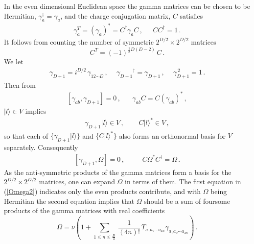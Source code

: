 \documentclass[a4paper,11pt]{article}
\newcommand{\const}{{\nu}}
\def\const{{\nu}}
\begin{document}
In the  even dimensional Euclidean space the gamma matrices can be chosen to be Hermitian, $\gamma_a^{\dagger}=\gamma_a$, and the charge conjugation
matrix, $C$  satisfies
\begin{equation}
\begin{array}{lll}
\gamma_a^{T}=(\gamma_{a})^{\ast}=C^{\dagger}\gamma_{a}C\,,~~~& CC^{\dagger}=1\,. \label{charge}
\end{array}
\end{equation}
It follows from counting the number of symmetric $2^{D/2}\times 2^{D/2}$ matrices\,\cite{Scherkkugotownsend}
\begin{equation}
C^{T}=(-1)^{\frac{1}{8}D(D-2)}\,C\,.
\end{equation}
We let
\begin{equation}
\begin{array}{lll}
\gamma_{D+1}=i^{D/2}\,\gamma_{12\cdots D}\,,~&~\gamma_{D+1}{}^{\dagger}=\gamma_{D+1}\,,~&~\gamma_{D+1}^{\,2}=1\,.
\end{array}
\end{equation}
Then from
\begin{equation} \begin{array}{ll}
[\gamma_{ab},\gamma_{D+1}]=0\,,~~&~~ \gamma_{ab}C=C(\gamma_{ab})^{\ast}\,, \end{array}
\end{equation}
$|l\rangle\in V$ implies
\begin{equation}
\begin{array}{ll}
\gamma_{D+1}|l\rangle\in V\,,~~~&~~~C|l\rangle^{\ast}\in V\,,
\end{array}
\end{equation}
so that each of $\{\gamma_{D+1}|l\rangle \}$ and $\{C|l\rangle^{\ast}\}$ also  forms  an  orthonormal basis for $V$ separately. Consequently
\begin{equation}
\begin{array}{cc}
[\gamma_{D+1},\Omega]=0\,,~~~~&~~~~C\Omega^{\ast}C^{\dagger}=\Omega\,.
\end{array}
\label{Omega2}
\end{equation}
As the anti-symmetric products of the gamma matrices form a basis for the $2^{D/2}\times 2^{D/2}$ matrices, one can expand $\Omega$ in terms of
them. The first equation in (\ref{Omega2}) indicates only the even products contribute, and with $\Omega$ being Hermitian the second equation implies
that $\Omega$ should be a sum of foursome products of the gamma matrices with real coefficients
\begin{equation}
\Omega=\const\left(1+ \sum_{1\leq n\leq
\frac{D}{4}}\,\frac{1}{(4n)!}\,T_{a_{1}a_{2}\cdots a_{4n}}\gamma_{a_{1}a_{2}\cdots
a_{4n}}\right)\, .
\end{equation}
\end{document}
